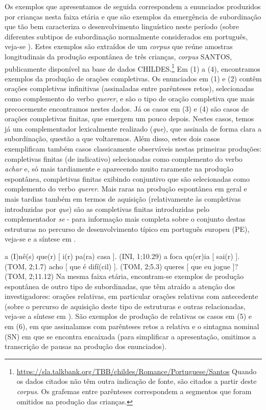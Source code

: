 \documentclass[output=paper,colorlinks,citecolor=brown,booklanguage=portuguese]{langscibook}
\begin{document}
Os exemplos que apresentamos de seguida correspondem a enunciados produzidos por crianças nesta faixa etária e que são exemplos da emergência de subordinação que tão bem caracteriza o desenvolvimento linguístico neste período (sobre diferentes subtipos de subordinação normalmente considerados em português, veja-se ). Estes exemplos são extraídos de um \emph{corpus} que reúne amostras longitudinais da produção espontânea de três crianças, \emph{corpus} SANTOS, publicamente disponível na base de dados CHILDES.\footnote{\url{https://sla.talkbank.org/TBB/childes/Romance/Portuguese/Santos} Quando os dados citados não têm outra indicação de fonte, são citados a partir deste \emph{corpus}. Os grafemas entre parênteses correspondem a segmentos que foram omitidos na produção das crianças.} Em (1) a (4), encontramos exemplos da produção de orações completivas. Os enunciados em (1) e (2) contêm orações completivas infinitivas (assinaladas entre parênteses retos), selecionadas como complemento do verbo \emph{querer}, e são o tipo de oração completiva que mais precocemente encontramos nestes dados. Já os casos em (3) e (4) são casos de orações completivas finitas, que emergem um pouco depois. Nestes casos, temos já um complementador lexicalmente realizado (\emph{que}), que assinala de forma clara a subordinação, questão a que voltaremos. Além disso, estes dois casos exemplificam também casos classicamente observáveis nestas primeiras produções: completivas finitas (de indicativo) selecionadas como complemento do verbo \emph{achar} e, só mais tardiamente e aparecendo muito raramente na produção espontânea, completivas finitas exibindo conjuntivo que são selecionadas como complemento do verbo \emph{querer}. Mais raras na produção espontânea em geral e mais tardias também em termos de aquisição (relativamente às completivas introduzidas por \emph{que}) são as completivas finitas introduzidas pelo complementador \emph{se} - para informação mais completa sobre o conjunto destas estruturas no percurso de desenvolvimento típico em português europeu (PE), veja-se \citet{Soares2006} e a síntese em \citet{Santos2017a}. 

\ea
    \label{ex:13:1} a (I)nê(s) que(r) [ i(r) pa(ra) casa ]. \hfill (INI, 1;10.29)
    \z
    \ea
    \label{ex:13:2} a foca qu(er)ia [ sai(r) ].	\hfill   			(TOM, 2;1.7)
    \z
    \ea
    \label{ex:13:3} acho [ que é difí(cil) ]. 		\hfill 		(TOM, 2;5.3)
    \z
    \ea
    \label{ex:13:4} queres [ que eu jogue ]?	\hfill 	(TOM, 2;11.12)
\z
Na mesma faixa etária, encontram-se exemplos de produção espontânea de outro tipo de subordinadas, que têm atraído a atenção dos investigadores: orações relativas, em particular orações relativas com antecedente (sobre o percurso de aquisição deste tipo de estruturas e outras relacionadas, veja-se a síntese em \citealp{Lobo2017}). São exemplos de produção de relativas os casos em (5) e em (6), em que assinalamos com parênteses retos a relativa e o sintagma nominal (SN) em que se encontra encaixada (para simplificar a apresentação, omitimos a transcrição de pausas na produção dos enunciados).
\end{document}
